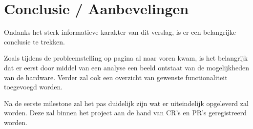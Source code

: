 \section{Conclusie / Aanbevelingen}

Ondanks het sterk informatieve karakter van dit verslag, is er een belangrijke conclusie te trekken.

Zoals tijdens de probleemstelling op pagina \pageref{probleemstelling} al naar voren kwam, is het belangrijk dat er eerst door middel van een analyse een beeld ontstaat van de mogelijkheden van de hardware. Verder zal ook een overzicht van gewenste functionaliteit toegevoegd worden.

Na de eerste milestone zal het pas duidelijk zijn wat er uiteindelijk opgeleverd zal worden. Deze zal binnen het project aan de hand van CR's en PR's geregistreerd worden.
